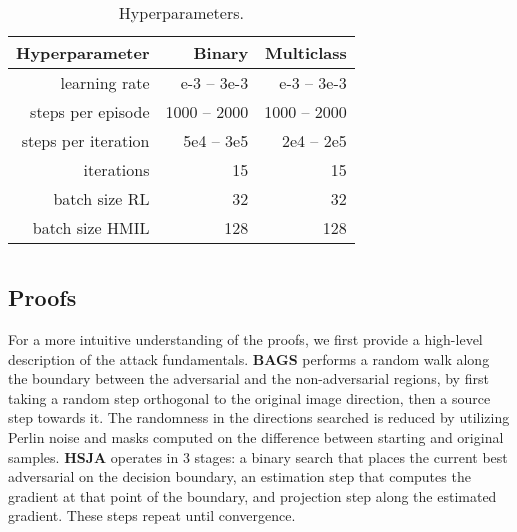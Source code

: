 \begin{table}[h!]
\centering
\renewcommand*{\arraystretch}{1.05}
\caption{Hyperparameters.}
\begin{tabular}{|r|r|r|}
\toprule
\textbf{Hyperparameter} &\bf Binary &\bf Multiclass\\
\midrule
learning rate & e-3 -- 3e-3 & e-3 -- 3e-3 \\
steps per episode & 1000 -- 2000 & 1000 -- 2000 \\
steps per iteration & 5e4 -- 3e5 & 2e4 -- 2e5\\
iterations & 15 & 15\\
batch size RL& 32 & 32\\
batch size HMIL& 128 & 128\\
\bottomrule
\end{tabular}
\label{tbl:hyper}
\end{table}

\chapter{}\label{apx:markovgames}

\section{Proofs}
\label{apx:proofs}

For a more intuitive understanding of the proofs, we first provide a high-level description of the attack fundamentals.
\textbf{BAGS} \cite{brunner2019guessing} performs a random walk along the boundary between the adversarial and the non-adversarial regions, by first taking a random step orthogonal to the original image direction, then a source step towards it.
The randomness in the directions searched is reduced by utilizing Perlin noise and masks computed on the difference between starting and original samples.
\textbf{HSJA} \cite{chen2020hopskipjumpattack} operates in 3 stages: a binary search that places the current best adversarial on the decision boundary, an estimation step that computes the gradient at that point of the boundary, and projection step along the estimated gradient.
These steps repeat until convergence.
\vspace{1em}

